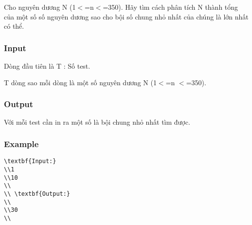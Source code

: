 



   Cho nguyên dương N (1$<$=n$<$=350). Hãy tìm cách phân tích N thành tổng của một số số nguyên dương sao cho bội số chung nhỏ nhất của chúng là lớn nhất có thể.  

\subsubsection{   Input  }

   Dòng đầu tiên là T : Số test.  

   T dòng sao mỗi dòng là một số nguyên dương N (1$<$=n $<$=350).  

\subsubsection{   Output  }

   Với mỗi test cần in ra một số là bội chung nhỏ nhất tìm được.  



\subsubsection{   Example  }
\begin{verbatim}
\textbf{Input:}
\\1
\\10
\\
\\ \textbf{Output:}
\\
\\30
\\\end{verbatim}